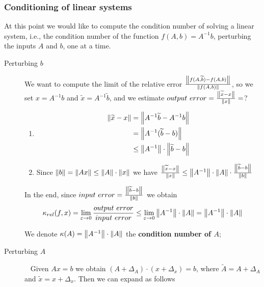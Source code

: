 \documentclass[computational_mathematics.tex]{subfiles}
\begin{document}
\subsubsection{Conditioning of linear systems}
At this point we would like to compute the condition number of solving a linear system, i.e., the condition number of the function $f(A,b)=A^{-1}b$, perturbing the inputs $A$ and $b$, one at a time.

\begin{description}
  \item[{\sc Perturbing} $b$] We want to compute the limit of the relative error $\frac{\left\lVert f(A, \widetilde{b}) - f(A, b)\right\rVert}{\left\lVert f(A, b)\right\rVert}$, so we set $x=A^{-1}b$ and $\tilde{x}=A^{-1}\tilde{b}$, and we estimate $output ~ error = \frac{\left\lVert\widetilde{x}-x\right\rVert}{\left\lVert x\right\rVert} =$?
    \begin{enumerate}
        \item \begin{equation}
          \begin{aligned}
            \left\lVert\widetilde{x} - x\right\rVert &= \left\lVert{A}^{-1} \widetilde{b} - {A}^{-1} b\right\rVert\\
            &= \left\lVert{A}^{-1} (\widetilde{b} - b)\right\rVert\\
            &\le \left\lVert{A}^{-1}\right\rVert \cdot \left\lVert\widetilde{b} - b\right\rVert\\
          \end{aligned}
          \end{equation}
        \item Since $\left\lVert b\right\rVert = \left\lVert Ax\right\rVert \le \left\lVert A\right\rVert \cdot \left\lVert x\right\rVert$ we have
          $\frac{\left\lVert\widetilde{x} - x\right\rVert}{\left\lVert x\right\rVert} \le \left\lVert{A}^{-1}\right\rVert \cdot \left\lVert A\right\rVert \cdot \frac{\left\lVert\widetilde{b} - b\right\rVert}{\left\lVert b\right\rVert}$
    \end{enumerate}
    In the end, since $input ~ error = \frac{\left\lVert\widetilde{b} - b\right\rVert}{\left\lVert b\right\rVert}$ we obtain 
    \[
      \kappa_{rel} (f, x) = \lim\limits_{\varepsilon \rightarrow 0} \frac{output ~ error}{input ~ error} \le \lim\limits_{\varepsilon \rightarrow 0} \left\lVert{A}^{-1}\right\rVert \cdot \left\lVert A\right\rVert = \left\lVert{A}^{-1}\right\rVert \cdot \left\lVert A\right\rVert
    \]
    
    We denote $\kappa(A) = \left\lVert{A}^{-1}\right\rVert \cdot \left\lVert A\right\rVert$ the \textbf{condition number of $A$};

  \item[{\sc Perturbing} $A$]~%
    Given $Ax=b$ we obtain $(A+\Delta_A) \cdot (x + \Delta_x)= b$, where $\widetilde{A} = A + \Delta_A$ and $\widetilde{x} = x + \Delta_x$. Then we can expand as follows


\end{description}
\end{document}
